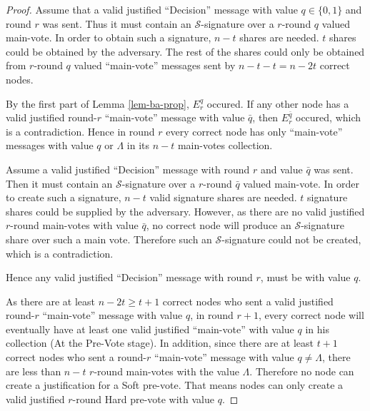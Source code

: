 \begin{proof}
   Assume that a valid justified ``Decision'' message with value $q \in \{0,1\}$
   and round $r$ was sent. Thus it must contain an $\mathcal{S}$-signature over
   a $r$-round $q$ valued main-vote. In order to obtain such a signature, $n-t$
   shares are needed. $t$ shares could be obtained by the adversary. The rest of
   the shares could only be obtained from $r$-round $q$ valued ``main-vote''
   messages sent by $n-t-t=n-2t$ correct nodes.
   
   By the first part of Lemma \ref{lem-ba-prop}, $E_r^q$ occured. If any other
   node has a valid justified round-$r$ ``main-vote'' message with value
   $\bar{q}$, then $E_r^{\bar{q}}$ occured, which is a contradiction. Hence in
   round $r$ every correct node has only ``main-vote'' messages with value
   $q$ or $\Lambda$ in its $n-t$ main-votes collection.

   Assume a valid justified ``Decision'' message with round $r$ and value
   $\bar{q}$ was sent. Then it must contain an $\mathcal{S}$-signature over a
   $r$-round $\bar{q}$ valued main-vote. In order to create such a signature,
   $n-t$ valid signature shares are needed. $t$ signature shares could be
   supplied by the adversary. However, as there are no valid justified $r$-round
   main-votes with value $\bar{q}$, no correct node will produce an
   $\mathcal{S}$-signature share over such a main vote. Therefore such an
   $\mathcal{S}$-signature could not be created, which is a contradiction.

   Hence any valid justified ``Decision'' message with round $r$, must be with
   value $q$.
   
   As there are at least $n-2t \geq t+1$ correct nodes who sent a valid justified
   round-$r$ ``main-vote'' message with value $q$, in round $r+1$, every correct
   node will eventually have at least one valid justified ``main-vote'' with
   value $q$ in his collection (At the Pre-Vote stage). In addition, since there
   are at least $t+1$ correct nodes who sent a round-$r$ ``main-vote'' message
   with value $q \neq \Lambda$, there are less than $n-t$ $r$-round main-votes
   with the value $\Lambda$. Therefore no node can create a justification for a
   Soft pre-vote. That means nodes can only create a valid justified $r$-round
   Hard pre-vote with value $q$.


\end{proof}
